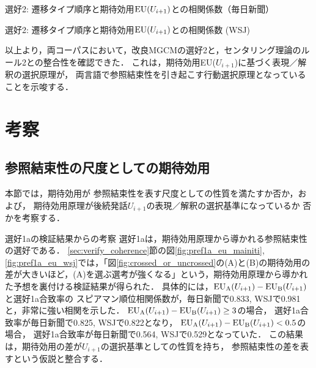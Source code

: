 \documentclass[japanese]{jnlp_1.3e}
\renewcommand{\paragraph}{}
\begin{document}
\begin{table}[t]
\caption{選好2: 遷移タイプ順序と期待効用${\rm EU}(U_{i+1})$との相関係数（毎日新聞）}
\label{tab:pref2_mainiti}

\end{table}
\begin{table}[t]
\caption{選好2: 遷移タイプ順序と期待効用${\rm EU}(U_{i+1})$との相関係数 (WSJ)}
\label{tab:pref2_wsj}

\end{table}


以上より，両コーパスにおいて，改良MGCMの選好2と，センタリング理論のルール2との整合性を確認できた．
これは，期待効用EU($U_{i+1}$)に基づく表現／解釈の選択原理が，
両言語で参照結束性を引き起こす行動選択原理となっていることを示唆する．











\section{考察}
\label{sec:discussion}

\subsection{参照結束性の尺度としての期待効用}
\label{sec:scale_validity}

本節では，期待効用が
参照結束性を表す尺度としての性質を満たすか否か，および，
期待効用原理が後続発話$U_{i+1}$の表現／解釈の選択基準になっているか
否かを考察する．


\paragraph{選好1aの検証結果からの考察} 
選好1aは，期待効用原理から導かれる参照結束性の選好である．
\ref{sec:verify_coherence}節の図\ref{fig:pref1a_eu_mainiti}, \ref{fig:pref1a_eu_wsj}では，「図\ref{fig:crossed_or_uncrossed}の(A)と(B)の期待効用の差が大きいほど，(A)を選ぶ選考が強くなる」という，期待効用原理から導かれた予想を裏付ける検証結果が得られた．
具体的には，${\rm EU_A}(U_{i+1})-{\rm EU_B}(U_{i+1})$と選好1a合致率の
スピアマン順位相関係数が，毎日新聞で0.833, WSJで0.981と，非常に強い相関を示した．
${\rm EU_A}(U_{i+1})-{\rm EU_B}(U_{i+1})\ge 3$の場合，
選好1a合致率が毎日新聞で0.825, WSJで0.822となり，
${\rm EU_A}(U_{i+1})-{\rm EU_B}(U_{i+1})< 0.5$の場合，
選好1a合致率が毎日新聞で0.564, WSJで0.529となっていた．
この結果は，期待効用の差が$U_{i+1}$の選択基準としての性質を持ち，
参照結束性の差を表すという仮説と整合する．
\end{document}
